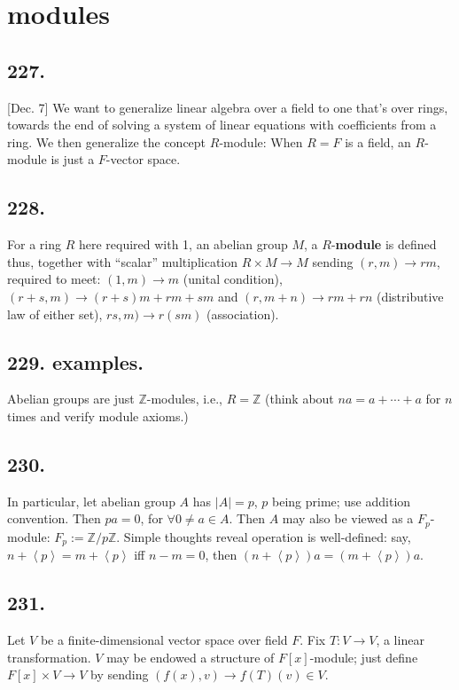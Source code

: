 \documentclass[12pt]{article}
\newcommand{\X}\times%
\newcommand{\Ev}\forall%
\newcommand{\Ar}\rightarrow%
\newcommand{\Ab}[1]{ \left\langle #1 \right\rangle } %
\newcommand{\BF}[1]{ \mathbb{#1} }%
\newcommand{\Ss}[1]{\textsf{\bfseries{#1}}}%
\begin{document}
\section{modules}
\subsection*{227.} [Dec. 7] We want to generalize linear algebra over a field to one that's over rings, towards the end of solving a system of linear equations with coefficients from a ring. 
We then generalize the concept \(R\)-module: When \(R=F\) is a field, an \(R\)-module is just a \(F\)-vector space. 

\subsection*{228.} For a ring \(R\) here required with 1, an abelian group \(M\), a \(R\)-\Ss{module} is defined thus, together with ``scalar'' multiplication \(R \X M \Ar M\) sending \((r,m) \Ar rm\), required to meet: 
\((1,m) \Ar m\) (unital condition), \((r+s,m) \Ar (r+s)m +rm+sm\) and \((r,m+n) \Ar rm +rn\) (distributive law of either set), \(rs,m) \Ar r(sm)\) (association). 

\subsection*{229. examples.} Abelian groups are just \(\BF{Z}\)-modules, i.e., \(R=\BF{Z}\) (think about \(na =a+\dotsb+a\) for \(n\) times and verify module axioms.)

\subsection*{230.} In particular, let abelian group \(A\) has \(|A| =p\), \(p\) being prime; use addition convention. 
Then \(pa =0\), for \(\Ev 0 \neq a\in A\). 
Then \(A\) may also be viewed as a \(F_p\)-module: \(F_p := \BF{Z}/p\BF{Z}\). 
Simple thoughts reveal operation is well-defined: say, \(n+\Ab{p} =m+\Ab{p}\) iff \(n-m =0\), then \((n+\Ab{p})a =(m+\Ab{p})a\). 

\subsection*{231.} Let \(V\) be a finite-dimensional vector space over field \(F\). Fix \(T: V \Ar V\), a linear transformation. 
\(V\) may be endowed a structure of \(F[x]\)-module; just define \(F[x] \X V \Ar V\) by sending \((f(x),v) \Ar f(T)(v) \in V\). 
\end{document}
